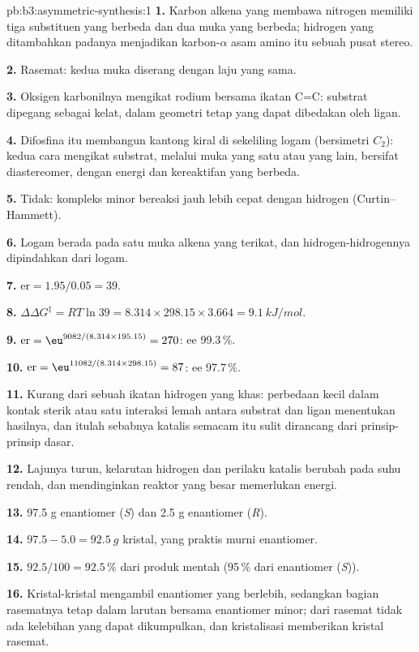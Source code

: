 \begin{solution}{pb:b3:asymmetric-synthesis:1}
\textbf{1.} Karbon alkena yang membawa nitrogen memiliki tiga substituen yang berbeda
dan dua muka yang berbeda; hidrogen yang ditambahkan padanya menjadikan karbon-$\alpha$ asam
amino itu sebuah pusat stereo.

\textbf{2.} Rasemat: kedua muka diserang dengan laju yang sama.

\textbf{3.} Oksigen karbonilnya mengikat rodium bersama ikatan C=C: substrat dipegang
sebagai kelat, dalam geometri tetap yang dapat dibedakan oleh ligan.

\textbf{4.} Difosfina itu membangun kantong kiral di sekeliling logam (bersimetri $C_2$): kedua cara
mengikat substrat, melalui muka yang satu atau yang lain, bersifat diastereomer, dengan energi
dan kereaktifan yang berbeda.

\textbf{5.} Tidak: kompleks minor bereaksi jauh lebih cepat dengan hidrogen (Curtin--Hammett).

\textbf{6.} Logam berada pada satu muka alkena yang terikat, dan hidrogen-hidrogennya
dipindahkan dari logam.

\textbf{7.} $\mathrm{er} = 1.95/0.05 = 39$.

\textbf{8.} $\Delta\Delta G^\ddagger = RT\ln 39 = 8.314 \times 298.15 \times 3.664 = \qty{9.1}{kJ/mol}$.

\textbf{9.} $\mathrm{er} = \eu^{9082/(8.314 \times 195.15)} = 270$: ee 99.3\,\%.

\textbf{10.} $\mathrm{er} = \eu^{11082/(8.314 \times 298.15)} = 87$: ee 97.7\,\%.

\textbf{11.} Kurang dari sebuah ikatan hidrogen yang khas: perbedaan kecil dalam kontak
sterik atau satu interaksi lemah antara substrat dan ligan menentukan
hasilnya, dan itulah sebabnya katalis semacam itu sulit dirancang dari prinsip-prinsip dasar.

\textbf{12.} Lajunya turun, kelarutan hidrogen dan perilaku katalis berubah
pada suhu rendah, dan mendinginkan reaktor yang besar memerlukan energi.

\textbf{13.} 97.5 g enantiomer (\textit{S}) dan 2.5 g enantiomer (\textit{R}).

\textbf{14.} $97.5 - 5.0 = \qty{92.5}{g}$ kristal, yang praktis murni enantiomer.

\textbf{15.} $92.5/100 = 92.5$\,\% dari produk mentah (95\,\% dari enantiomer (\textit{S})).

\textbf{16.} Kristal-kristal mengambil enantiomer yang berlebih, sedangkan bagian rasematnya tetap dalam
larutan bersama enantiomer minor; dari rasemat tidak ada kelebihan yang dapat dikumpulkan, dan
kristalisasi memberikan kristal rasemat.


\end{solution}

